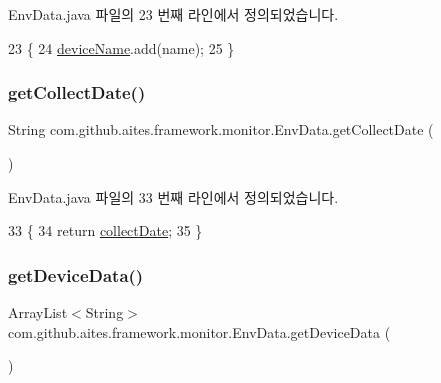 Env\+Data.\+java 파일의 23 번째 라인에서 정의되었습니다.


\begin{DoxyCode}
23                                           \{
24         \mbox{\hyperlink{classcom_1_1github_1_1aites_1_1framework_1_1monitor_1_1_env_data_acee6d64d485b093c7fce1d7a67095457}{deviceName}}.add(name);
25     \}
\end{DoxyCode}
\mbox{\label{classcom_1_1github_1_1aites_1_1framework_1_1monitor_1_1_env_data_a1bcf9a801b4d614fdf567ec20121638c}} 
\subsubsection{\texorpdfstring{get\+Collect\+Date()}{getCollectDate()}}
{\footnotesize\ttfamily String com.\+github.\+aites.\+framework.\+monitor.\+Env\+Data.\+get\+Collect\+Date (\begin{DoxyParamCaption}{ }\end{DoxyParamCaption})}



Env\+Data.\+java 파일의 33 번째 라인에서 정의되었습니다.


\begin{DoxyCode}
33                                   \{
34         \textcolor{keywordflow}{return} \mbox{\hyperlink{classcom_1_1github_1_1aites_1_1framework_1_1monitor_1_1_env_data_aa8a06c5bb87ce218bd214343bf78f45e}{collectDate}};
35     \}
\end{DoxyCode}
\mbox{\label{classcom_1_1github_1_1aites_1_1framework_1_1monitor_1_1_env_data_a4046763707974cd911f699f413469831}} 
\subsubsection{\texorpdfstring{get\+Device\+Data()}{getDeviceData()}}
{\footnotesize\ttfamily Array\+List$<$String$>$ com.\+github.\+aites.\+framework.\+monitor.\+Env\+Data.\+get\+Device\+Data (\begin{DoxyParamCaption}{ }\end{DoxyParamCaption})}



